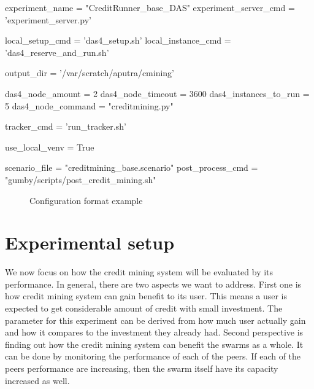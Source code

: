 \begin{verbbox}
experiment_name = "CreditRunner_base_DAS"
experiment_server_cmd = 'experiment_server.py'

local_setup_cmd = 'das4_setup.sh'
local_instance_cmd = 'das4_reserve_and_run.sh'

output_dir = '/var/scratch/aputra/cmining'

das4_node_amount = 2
das4_node_timeout = 3600
das4_instances_to_run = 5
das4_node_command = "creditmining.py"

tracker_cmd = 'run_tracker.sh'

use_local_venv = True

scenario_file = "creditmining_base.scenario"
post_process_cmd = "gumby/scripts/post_credit_mining.sh"
\end{verbbox}
\begin{figure}[]
	\fbox{\theverbbox}
	\caption{Configuration format example}
	\label{fig:gumbyconf}
\end{figure}

\section{Experimental setup}
\label{section:cmexp}
We now focus on how the credit mining system will be evaluated by its performance. In general, there are two aspects we want to address. First one is how credit mining system can gain benefit to its user. This means a user is expected to get considerable amount of credit with small investment. The parameter for this experiment can be derived from how much user actually gain and how it compares to the investment they already had. Second perspective is finding out how the credit mining system can benefit the swarms as a whole. It can be done by monitoring the performance of each of the peers. If each of the peers performance are increasing, then the swarm itself have its capacity increased as well.


